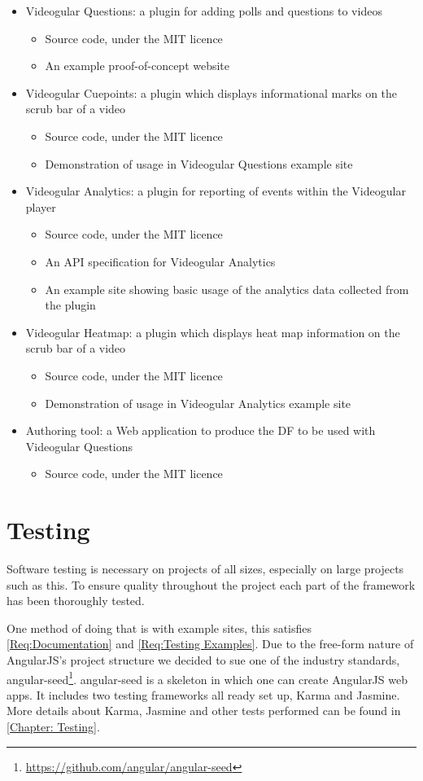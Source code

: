 \begin{itemize}
\item Videogular Questions: a plugin for adding polls and questions to videos
\begin{itemize}
\item Source code, under the MIT licence
\item An example proof-of-concept website
\end{itemize}
\item Videogular Cuepoints: a plugin which displays informational marks on the scrub bar of a video
\begin{itemize}
\item Source code, under the MIT licence
\item Demonstration of usage in Videogular Questions example site
\end{itemize}
\item Videogular Analytics: a plugin for reporting of events within the Videogular player
\begin{itemize}
\item Source code, under the MIT licence
\item An API specification for Videogular Analytics
\item An example site showing basic usage of the analytics data collected from the plugin
\end{itemize}
\item Videogular Heatmap: a plugin which displays heat map information on the scrub bar of a video
\begin{itemize}
\item Source code, under the MIT licence
\item Demonstration of usage in Videogular Analytics example site
\end{itemize}
\item Authoring tool: a Web application to produce the \gls{DF} to be used with Videogular Questions
\begin{itemize}
\item Source code, under the MIT licence
\end{itemize}
\end{itemize}


\section{Testing}
\label{Section:Overall_Testing}

Software testing is necessary on projects of all sizes, especially on large projects such as this. To ensure quality throughout the project each part of the framework has been thoroughly tested.

One method of doing that is with example sites, this satisfies \cref{Req:Documentation} and \cref{Req:Testing Examples}. Due to the free-form nature of AngularJS's project structure we decided to sue one of the industry standards, angular-seed\footnote{\url{https://github.com/angular/angular-seed}}. angular-seed is a skeleton in which one can create AngularJS web apps. It includes two testing frameworks all ready set up, Karma and Jasmine. More details about Karma, Jasmine and other tests performed can be found in \autoref{Chapter: Testing}.

